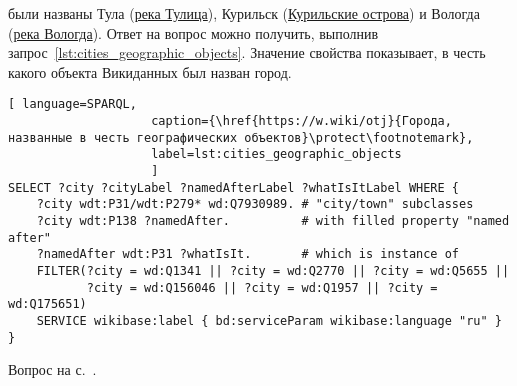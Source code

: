 %

\begin{task}
    \label{answer:cities_geographic_objects}
     были названы 
    Тула (\href{https://w.wiki/oLJ}{река Тулица}), 
    Курильск (\href{https://w.wiki/oLH}{Курильские острова}) 
    и Вологда (\href{https://w.wiki/oLG}{река Вологда}). 
    Ответ на вопрос можно получить, выполнив запрос~\ref{lst:cities_geographic_objects}. 
    Значение свойства  
    показывает, в честь какого объекта Викиданных был назван город.
   
\begin{lstlisting}[ language=SPARQL, 
                    caption={\href{https://w.wiki/otj}{Города, названные в честь географических объектов}\protect\footnotemark},
                    label=lst:cities_geographic_objects
                    ]
SELECT ?city ?cityLabel ?namedAfterLabel ?whatIsItLabel WHERE {
    ?city wdt:P31/wdt:P279* wd:Q7930989. # "city/town" subclasses
    ?city wdt:P138 ?namedAfter.          # with filled property "named after"
    ?namedAfter wdt:P31 ?whatIsIt.       # which is instance of
    FILTER(?city = wd:Q1341 || ?city = wd:Q2770 || ?city = wd:Q5655 ||
           ?city = wd:Q156046 || ?city = wd:Q1957 || ?city = wd:Q175651)
    SERVICE wikibase:label { bd:serviceParam wikibase:language "ru" }
}
\end{lstlisting}%
    \small{Вопрос на с.~\pageref{lst:population_town}.}
\end{task}

